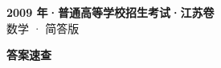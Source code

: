 \documentclass[zihao=-4, a4paper]{ctexart}
\begin{document}
\begin{center}
  {\Large\bfseries 2009 年·普通高等学校招生考试·江苏卷}\\[4pt]
  {\large 数学 · 简答版}
\end{center}
\medskip
{}

\clearpage
{}
\begin{center}{\Large\bfseries 答案速查}\end{center}
\medskip

\end{document}
